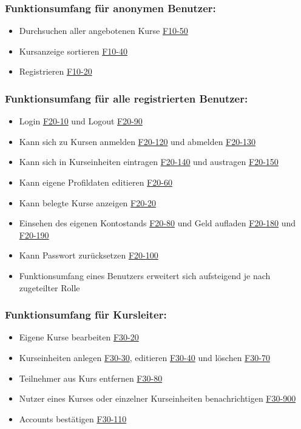 \documentclass[a4paper]{scrreprt}
\begin{document}
     	\subsubsection{Funktionsumfang für anonymen Benutzer:}
       		\begin{itemize}
	      		\item Durchsuchen aller angebotenen Kurse \hyperlink{kursSuche}{F10-50}
	      		\item Kursanzeige sortieren \hyperlink{kursAnzSort}{F10-40}
	       		\item Registrieren \hyperlink{Registrieren}{F10-20}
       		\end{itemize}
     	\subsubsection{Funktionsumfang für alle registrierten Benutzer:}
			\begin{itemize}
				\item Login \hyperlink{login}{F20-10} und Logout \hyperlink{logout}{F20-90}
				\item Kann sich zu Kursen anmelden \hyperlink{kursAnmelden}{F20-120} und abmelden \hyperlink{kursAbmelden}{F20-130}
				\item Kann sich in Kurseinheiten eintragen \hyperlink{kurseinheitAnmelden}{F20-140} und austragen \hyperlink{kurseinheitAbmelden}{F20-150}
				\item Kann eigene Profildaten editieren \hyperlink{profilEdit}{F20-60}
				\item Kann belegte Kurse anzeigen \hyperlink{kurseAnzeigen}{F20-20}
				\item Einsehen des eigenen Kontostands \hyperlink{kontoAnzeigen}{F20-80} und Geld aufladen \hyperlink{kontoAufladenOn}{F20-180} und \hyperlink{kontoAufladenOff}{F20-190}
				\item Kann Passwort zurücksetzen \hyperlink{passwort}{F20-100}
				\item Funktionsumfang eines Benutzers erweitert sich aufsteigend je nach zugeteilter Rolle
			\end{itemize}
		\subsubsection{Funktionsumfang für Kursleiter:}
			\begin{itemize}
				\item Eigene Kurse bearbeiten \hyperlink{kursEdit}{F30-20}
				\item Kurseinheiten anlegen \hyperlink{kurseinheitAnlegen}{F30-30}, editieren \hyperlink{kurseinheitEdit}{F30-40} und löschen \hyperlink{kurseinheitLoeschen}{F30-70}
				\item Teilnehmer aus Kurs entfernen \hyperlink{kursUserDel}{F30-80}
				\item Nutzer eines Kurses oder einzelner Kurseinheiten benachrichtigen \hyperlink{kursUserMsg}{F30-900}
				\item Accounts bestätigen \hyperlink{addUserKL}{F30-110}
			\end{itemize}
\end{document}
